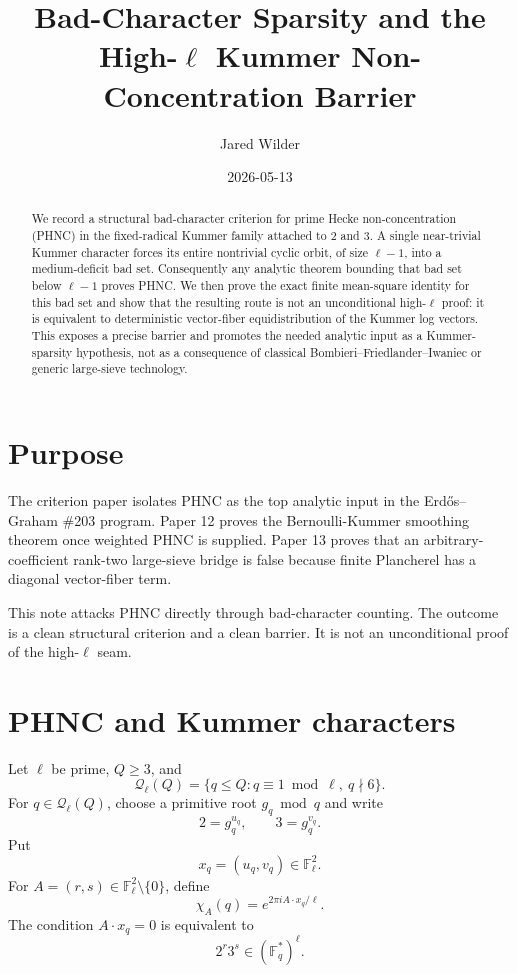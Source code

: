 \documentclass[11pt]{article}
\title{Bad-Character Sparsity and the High-\(\ell\) Kummer Non-Concentration Barrier}
\author{Jared Wilder}
\date{2026-05-13}
\newcommand{\F}{\mathbb F}
\newcommand{\1}{\mathbf 1}
\begin{document}
\maketitle

\begin{abstract}
We record a structural bad-character criterion for prime Hecke non-concentration (PHNC) in the fixed-radical Kummer family attached to \(2\) and \(3\).  A single near-trivial Kummer character forces its entire nontrivial cyclic orbit, of size \(\ell-1\), into a medium-deficit bad set.  Consequently any analytic theorem bounding that bad set below \(\ell-1\) proves PHNC.  We then prove the exact finite mean-square identity for this bad set and show that the resulting route is not an unconditional high-\(\ell\) proof: it is equivalent to deterministic vector-fiber equidistribution of the Kummer log vectors.  This exposes a precise barrier and promotes the needed analytic input as a Kummer-sparsity hypothesis, not as a consequence of classical Bombieri--Friedlander--Iwaniec or generic large-sieve technology.
\end{abstract}

\section{Purpose}

The criterion paper isolates PHNC as the top analytic input in the Erd\H{o}s--Graham \#203 program.  Paper 12 proves the Bernoulli-Kummer smoothing theorem once weighted PHNC is supplied.  Paper 13 proves that an arbitrary-coefficient rank-two large-sieve bridge is false because finite Plancherel has a diagonal vector-fiber term.

This note attacks PHNC directly through bad-character counting.  The outcome is a clean structural criterion and a clean barrier.  It is not an unconditional proof of the high-\(\ell\) seam.

\section{PHNC and Kummer characters}

Let \(\ell\) be prime, \(Q\ge3\), and
\[
\mathcal Q_\ell(Q)=\{q\le Q:q\equiv1\bmod \ell,\ q\nmid6\}.
\]
For \(q\in\mathcal Q_\ell(Q)\), choose a primitive root \(g_q\bmod q\) and write
\[
2=g_q^{u_q},\qquad 3=g_q^{v_q}.
\]
Put
\[
x_q=(u_q,v_q)\in\F_\ell^2.
\]
For \(A=(r,s)\in\F_\ell^2\setminus\{0\}\), define
\[
\chi_A(q)=e^{2\pi i A\cdot x_q/\ell}.
\]
The condition \(A\cdot x_q=0\) is equivalent to
\[
2^r3^s\in(\F_q^*)^\ell.
\]
\end{document}
